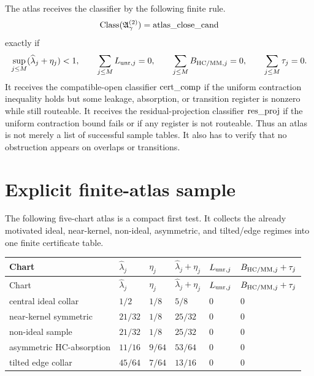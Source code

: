 \begin{definition}
The atlas receives the classifier by the following finite rule.
\[
\mathrm{Class}(\mathfrak A_{\gamma}^{(2)})=\mathrm{atlas\_close\_cand}
\]
exactly if
\[
\sup_{j\le M}(\widehat\lambda_j+\eta_j)<1,\qquad
\sum_{j\le M}L_{\mathrm{unr},j}=0,\qquad
\sum_{j\le M}B_{\mathrm{HC}/\mathrm{MM},j}=0,\qquad
\sum_{j\le M}\tau_j=0.
\]
It receives the compatible-open classifier \(\mathrm{cert\_comp}\) if the uniform contraction inequality holds but some leakage, absorption, or transition register is nonzero while still routeable. It receives the residual-projection classifier \(\mathrm{res\_proj}\) if the uniform contraction bound fails or if any register is not routeable. Thus an atlas is not merely a list of successful sample tables. It also has to verify that no obstruction appears on overlaps or transitions.
\end{definition}

\section{Explicit finite-atlas sample}

The following five-chart atlas is a compact first test. It collects the already motivated ideal, near-kernel, non-ideal, asymmetric, and tilted/edge regimes into one finite certificate table.

{\small\setlength{\tabcolsep}{3pt}
\begin{longtable}{>{\raggedright\arraybackslash}p{3.0cm} >{\centering\arraybackslash}p{1.75cm} >{\centering\arraybackslash}p{1.55cm} >{\centering\arraybackslash}p{1.95cm} >{\centering\arraybackslash}p{1.55cm} >{\centering\arraybackslash}p{2.0cm}}
\toprule
Chart & \(\widehat\lambda_j\) & \(\eta_j\) & \(\widehat\lambda_j+\eta_j\) & \(L_{\mathrm{unr},j}\) & \(B_{\mathrm{HC}/\mathrm{MM},j}+\tau_j\) \\
\midrule
\endfirsthead
\toprule
Chart & \(\widehat\lambda_j\) & \(\eta_j\) & \(\widehat\lambda_j+\eta_j\) & \(L_{\mathrm{unr},j}\) & \(B_{\mathrm{HC}/\mathrm{MM},j}+\tau_j\) \\
\midrule
\endhead
central ideal collar & \(1/2\) & \(1/8\) & \(5/8\) & \(0\) & \(0\) \\
near-kernel symmetric & \(21/32\) & \(1/8\) & \(25/32\) & \(0\) & \(0\) \\
non-ideal sample & \(21/32\) & \(1/8\) & \(25/32\) & \(0\) & \(0\) \\
asymmetric HC-absorption & \(11/16\) & \(9/64\) & \(53/64\) & \(0\) & \(0\) \\
tilted edge collar & \(45/64\) & \(7/64\) & \(13/16\) & \(0\) & \(0\) \\
\bottomrule
\end{longtable}
}

